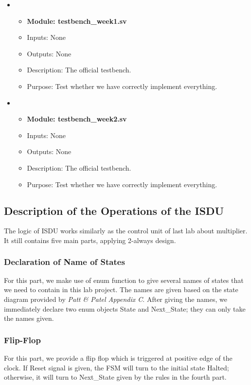 \documentclass[11pt]{article}
\begin{document}
\begin{itemize}
    \item
    \begin{itemize}
        \item \textbf{Module: testbench\_week1.sv}
        \item Inputs: None
        \item Outputs: None
        \item Description: The official testbench.
        \item Purpose: Test whether we have correctly implement everything.
    \end{itemize}

    \item
    \begin{itemize}
        \item \textbf{Module: testbench\_week2.sv}
        \item Inputs: None
        \item Outputs: None
        \item Description: The official testbench.
        \item Purpose: Test whether we have correctly implement everything.
    \end{itemize}

\end{itemize}

\subsection{Description of the Operations of the ISDU}
The logic of ISDU works similarly as the control unit of last lab about multiplier. It still contains five main parts, applying 2-always design.
\subsubsection{Declaration of Name of States}
For this part, we make use of enum function to give several names of states that we need to contain in this lab project. The names are given based on the state diagram provided by \emph{Patt \& Patel Appendix C}. After giving the names, we immediately declare two enum objects State and Next\_State; they can only take the names given.
\subsubsection{Flip-Flop}
For this part, we provide a flip flop which is triggered at positive edge of the clock. If Reset signal is given, the FSM will turn to the initial state Halted; otherwise, it will turn to Next\_State given by the rules in the fourth part.
\end{document}
